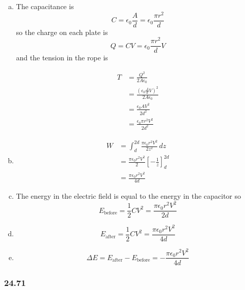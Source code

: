 \documentclass{article}
\begin{document}
\begin{enumerate}[(a)]
  \item The capacitance is \[C = \epsilon_0 \frac{A}{d} = \epsilon_0 \frac{\pi r^2}{d}\] so the charge on each plate is \[Q = C V = \epsilon_0 \frac{\pi r^2}{d} V\] and the tension in the rope is

        \begin{align*}
          T & = \frac{Q^2}{2 A \epsilon_0}                          \\
            & = \frac{(\epsilon_0 \frac{A}{d} V)^2}{2 A \epsilon_0} \\
            & = \frac{\epsilon_0 A V^2}{2 d^2}                      \\
            & = \frac{\epsilon_0 \pi r^2 V^2}{2 d^2}
        \end{align*}

  \item

        \begin{align*}
          W & = \int_d^{2 d} \frac{\pi \epsilon_0 r^2 V^2}{2 z^2} \,dz              \\
            & = \frac{\pi \epsilon_0 r^2 V^2}{2} \left[ -\frac{1}{z} \right]_d^{2d} \\
            & = \frac{\pi \epsilon_0 r^2 V^2}{4 d}
        \end{align*}

  \item The energy in the electric field is equal to the energy in the capacitor so \[E_\textrm{before} = \frac{1}{2} C V^2 = \frac{\pi \epsilon_0 r^2 V^2}{2 d}\]

  \item \[E_\textrm{after} = \frac{1}{2} C V^2 = \frac{\pi \epsilon_0 r^2 V^2}{4 d}\]

  \item \[\Delta E = E_\textrm{after} - E_\textrm{before} = -\frac{\pi \epsilon_0 r^2 V^2}{4 d}\]
\end{enumerate}

\subsubsection{24.71}
\end{document}
